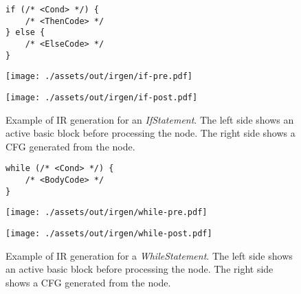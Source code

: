 \begin{figure}
    \begin{minipage}[t]{1\textwidth}
        \centering
        \begin{minipage}{0.7\textwidth}
            \begin{verbatim}
if (/* <Cond> */) {
    /* <ThenCode> */
} else {
    /* <ElseCode> */
}
            \end{verbatim}
        \end{minipage}
    \end{minipage}
    \vspace{0.5cm}

    \begin{minipage}[t]{0.49\textwidth}
        \vspace*{0mm}
        \centering
        \texttt{[image: ./assets/out/irgen/if-pre.pdf]}
    \end{minipage}
    \begin{minipage}[t]{0.49\textwidth}
        \vspace*{0mm}
        \centering
        \texttt{[image: ./assets/out/irgen/if-post.pdf]}
    \end{minipage}

    \caption{Example of IR generation for an \textit{IfStatement}. The left side shows an active basic block before processing the node. The right side shows a CFG generated from the node.}
    \label{fig:irgen:if}
\end{figure}

\begin{figure}
    \begin{minipage}[t]{1\textwidth}
        \centering
        \begin{minipage}{0.7\textwidth}
            \begin{verbatim}
while (/* <Cond> */) {
    /* <BodyCode> */
}
            \end{verbatim}
        \end{minipage}
    \end{minipage}
    \vspace{0.5cm}

    \begin{minipage}[t]{0.49\textwidth}
        \vspace*{0mm}
        \centering
        \texttt{[image: ./assets/out/irgen/while-pre.pdf]}
    \end{minipage}
    \begin{minipage}[t]{0.49\textwidth}
        \vspace*{0mm}
        \centering
        \texttt{[image: ./assets/out/irgen/while-post.pdf]}
    \end{minipage}

    \caption{Example of IR generation for a \textit{WhileStatement}. The left side shows an active basic block before processing the node. The right side shows a CFG generated from the node.}
    \label{fig:irgen:while}
\end{figure}


